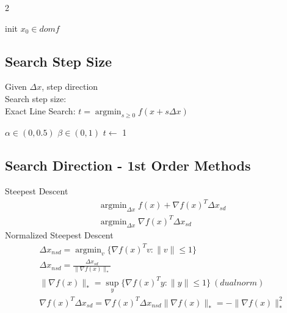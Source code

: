 \documentclass[8pt]{extarticle}
\DeclareMathOperator*{\argmin}{argmin}
\newcommand{\norm}[1]{\|#1\|}
\newcommand{\set}[1]{\{#1\}}
\begin{document}
\begin{multicols*}{2}
  \begin{algorithm}[H]
    init $x_0 \in dom f$\;
    \caption{Descent Overview\label{Descent}}
  \end{algorithm}
  
  \subsection{Search Step Size}
  Given $\Delta x$, step direction\\
  Search step size:\\
  Exact Line Search: $t = \argmin_{s\geq 0} f(x+s \Delta x)$\\

  \begin{algorithm}[H]
    $\alpha \in (0,0.5)$\;
    $\beta \in (0,1)$\;
    $t \leftarrow$ 1\;
    \caption{Backtracking Line Search\label{LS_BT}}
  \end{algorithm}

  \vfill\null
  \columnbreak
  
  \subsection{Search Direction - 1st Order Methods}
  Steepest Descent
  \begin{align*}
    &\argmin_{\Delta x} f(x) + \nabla f(x)^T \Delta x_{sd}\\
    &\argmin_{\Delta x} \nabla f(x)^T \Delta x_{sd}
  \end{align*}
  Normalized Steepest Descent
  \begin{align*}
    &\Delta x_{nsd} = \argmin_{v} \set{ \nabla f(x)^T v : \norm{v} \leq 1 }\\
    &\Delta x_{nsd} = \frac{\Delta x_{sd}}{\norm{\nabla f(x)}_*}\\
    &\norm{\nabla f(x)}_* = \sup_y \{\nabla f(x)^T y: \|y\| \leq 1 \}\ (dual norm)\\
    &\nabla f(x)^T \Delta x_{sd} = \nabla f(x)^T \Delta x_{nsd} \norm{\nabla f(x)}_* = -\norm{\nabla f(x)}_*^2
  \end{align*}


\end{multicols*}
\end{document}
